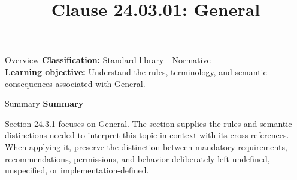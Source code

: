 \documentclass[10pt,letterpaper]{article}
\title{Clause 24.03.01: General}
\author{}
\date{}
\begin{document}
\maketitle
\begin{CornellOverviewBox}{Overview}
\textbf{Classification:} Standard library - Normative\\[2pt]
\textbf{Learning objective:} Understand the rules, terminology, and semantic consequences associated with General.
\end{CornellOverviewBox}\begin{CornellSummaryBox}{Summary}
{\sffamily\bfseries\color{Accent} Summary}\par\vspace{3pt}Section 24.3.1 focuses on General. The section supplies the rules and semantic distinctions needed to interpret this topic in context with its cross-references. When applying it, preserve the distinction between mandatory requirements, recommendations, permissions, and behavior deliberately left undefined, unspecified, or implementation-defined.
\end{CornellSummaryBox}
\end{document}
